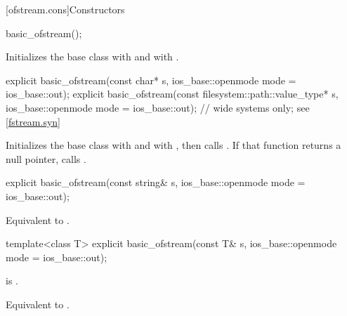 [ofstream.cons]{Constructors}

%
\begin{itemdecl}
basic_ofstream();
\end{itemdecl}

\begin{itemdescr}
\pnum
\effects
Initializes the base class with
and  with
.
\end{itemdescr}

%
\begin{itemdecl}
explicit basic_ofstream(const char* s,
                        ios_base::openmode mode = ios_base::out);
explicit basic_ofstream(const filesystem::path::value_type* s,
                        ios_base::openmode mode = ios_base::out); // wide systems only; see \ref{fstream.syn}
\end{itemdecl}

\begin{itemdescr}
\pnum
\effects
Initializes the base class with
and  with
,
then calls
.
If that function returns a null pointer, calls
.
\end{itemdescr}

%
\begin{itemdecl}
explicit basic_ofstream(const string& s,
                        ios_base::openmode mode = ios_base::out);
\end{itemdecl}

\begin{itemdescr}
\pnum
\effects
Equivalent to .
\end{itemdescr}

%
\begin{itemdecl}
template<class T>
  explicit basic_ofstream(const T& s, ios_base::openmode mode = ios_base::out);
\end{itemdecl}

\begin{itemdescr}
\pnum
\constraints
{} is .

\pnum
\effects
Equivalent to .
\end{itemdescr}

